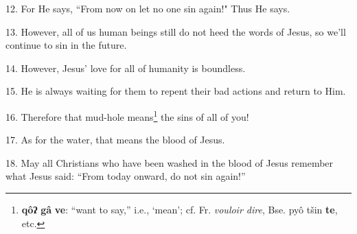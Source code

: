 12. For He says, ``From now on let no one sin again!" Thus He says.

13. However, all of us human beings still do not heed the words of Jesus, so we'll
continue to sin in the future.

14. However, Jesus' love for all of humanity is boundless.

15. He is always waiting for them to repent their bad actions and return to Him.

16. Therefore that mud-hole means\footnote{\textbf{qôʔ} \textbf{gâ} \textbf{ve}: ``want to say,'' i.e., `mean'; cf. Fr. \textit{vouloir dire}, Bse. pyô tšin \textbf{te}, etc.} the sins of all of you!

17. As for the water, that means the blood of Jesus.

18. May all Christians who have been washed in the blood of Jesus remember what
Jesus said: ``From today onward, do not sin again!''

